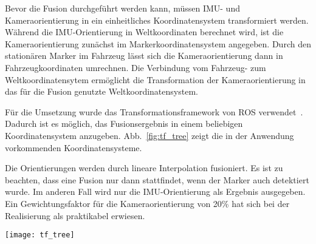 Bevor die Fusion durchgeführt werden kann, müssen IMU- und Kameraorientierung in ein einheitliches Koordinatensystem transformiert werden.
Während die IMU-Orientierung in Weltkoordinaten berechnet wird, ist die Kameraorientierung zunächst im Markerkoordinatensystem angegeben.
Durch den stationären Marker im Fahrzeug lässt sich die Kameraorientierung dann in Fahrzeugkoordinaten umrechnen.
Die Verbindung vom Fahrzeug- zum Weltkoordinatensytem ermöglicht die Transformation der Kameraorientierung in das für die Fusion genutzte Weltkoordinatensystem.

Für die Umsetzung wurde das Transformationsframework von \ac{ROS} verwendet~\cite{ros_tf}.
Dadurch ist es möglich, das Fusionsergebnis in einem beliebigen Koordinatensystem anzugeben. Abb.~\ref{fig:tf_tree} zeigt die in der Anwendung vorkommenden Koordinatensysteme.

Die Orientierungen werden durch lineare Interpolation fusioniert.
Es ist zu beachten, dass eine Fusion nur dann stattfindet, wenn der Marker auch detektiert wurde.
Im anderen Fall wird nur die IMU-Orientierung als Ergebnis ausgegeben.
Ein Gewichtungsfaktor für die Kameraorientierung von 20\% hat sich bei der Realisierung als praktikabel erwiesen.

\begin{figure*}[tb]
 \centering
 \texttt{[image: tf\_tree]}
  \caption{Koordinaten-Frames}
  \label{fig:tf_tree}
\end{figure*}

